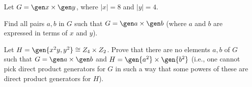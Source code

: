 \begin{specialexercise}\label{ex5.2.15}
    Let $G = \gen x \times \gen y$, where $|x| = 8$ and $|y| = 4$.
    \begin{subproblems}
        \item Find all pairs $a, b$ in $G$ such that $G = \gen a \times \gen b$ (where $a$ and $b$ are expressed in terms of $x$ and $y$).
        \item Let $H = \gen{x^2y, y^2} \cong Z_4 \times Z_2$. Prove that there are no elements $a, b$ of $G$ such that $G = \gen a \times \gen b$ and $H = \gen{a^2} \times \gen{b^2}$ (i.e., one cannot pick direct product generators for $G$ in such a way that some powers of these are direct product generators for $H$).
    \end{subproblems}
\end{specialexercise}

